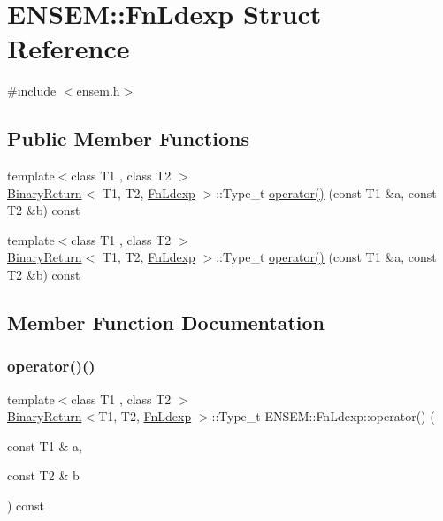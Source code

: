 \hypertarget{structENSEM_1_1FnLdexp}{}\section{E\+N\+S\+EM\+:\+:Fn\+Ldexp Struct Reference}
\label{structENSEM_1_1FnLdexp}


{\ttfamily \#include $<$ensem.\+h$>$}

\subsection*{Public Member Functions}
\begin{DoxyCompactItemize}
\item 
{\footnotesize template$<$class T1 , class T2 $>$ }\\\mbox{\hyperlink{structENSEM_1_1BinaryReturn}{Binary\+Return}}$<$ T1, T2, \mbox{\hyperlink{structENSEM_1_1FnLdexp}{Fn\+Ldexp}} $>$\+::Type\+\_\+t \mbox{\hyperlink{structENSEM_1_1FnLdexp_a018e96259f66cd8923edf0610629b52c}{operator()}} (const T1 \&a, const T2 \&b) const
\item 
{\footnotesize template$<$class T1 , class T2 $>$ }\\\mbox{\hyperlink{structENSEM_1_1BinaryReturn}{Binary\+Return}}$<$ T1, T2, \mbox{\hyperlink{structENSEM_1_1FnLdexp}{Fn\+Ldexp}} $>$\+::Type\+\_\+t \mbox{\hyperlink{structENSEM_1_1FnLdexp_a018e96259f66cd8923edf0610629b52c}{operator()}} (const T1 \&a, const T2 \&b) const
\end{DoxyCompactItemize}


\subsection{Member Function Documentation}
\mbox{\label{structENSEM_1_1FnLdexp_a018e96259f66cd8923edf0610629b52c}} 
\subsubsection{\texorpdfstring{operator()()}{operator()()}\hspace{0.1cm}{\footnotesize\ttfamily [1/2]}}
{\footnotesize\ttfamily template$<$class T1 , class T2 $>$ \\
\mbox{\hyperlink{structENSEM_1_1BinaryReturn}{Binary\+Return}}$<$T1, T2, \mbox{\hyperlink{structENSEM_1_1FnLdexp}{Fn\+Ldexp}} $>$\+::Type\+\_\+t E\+N\+S\+E\+M\+::\+Fn\+Ldexp\+::operator() (\begin{DoxyParamCaption}\item[{const T1 \&}]{a,  }\item[{const T2 \&}]{b }\end{DoxyParamCaption}) const\hspace{0.3cm}{\ttfamily [inline]}}

